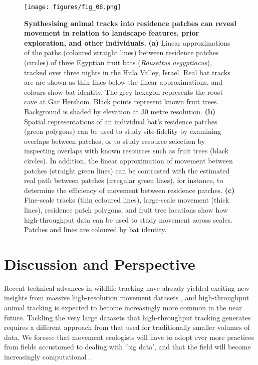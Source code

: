 \begin{refsection}[sorting=nyt]
    \begin{figure}[h!]
        \centering
        \texttt{[image: figures/fig\_08.png]}
        \caption{
            \textbf{Synthesising animal tracks into residence patches can reveal movement in relation to landscape features, prior exploration, and other individuals.}
            \textbf{(a)} Linear approximations of the paths (coloured straight lines) between residence patches (circles) of three Egyptian fruit bats (\textit{Rousettus aegyptiacus}), tracked over three nights in the Hula Valley, Israel.
            Real bat tracks are are shown as thin lines below the linear approximations, and colours show bat identity. The grey hexagon represents the roost-cave at Gar Hershom.
            Black points represent known fruit trees.
            Background is shaded by elevation at 30 metre resolution.
            \textbf{(b)} Spatial representations of an individual bat's residence patches (green polygons) can be used to study site-fidelity by examining overlaps between patches, or to study resource selection by inspecting overlaps with known resources such as fruit trees (black circles).
            In addition, the linear approximation of movement between patches (straight green lines) can be contrasted with the estimated real path between patches (irregular green lines), for instance, to determine the efficiency of movement between residence patches.
            \textbf{(c)} Fine-scale tracks (thin coloured lines), large-scale movement (thick lines), residence patch polygons, and fruit tree locations show how high-throughput data can be used to study movement across scales.
            Patches and lines are coloured by bat identity.
        }
        \label{fig:figure_bats}
    \end{figure}

    \section*{Discussion and Perspective}

    Recent technical advances in wildlife tracking have already yielded exciting new insights from massive high-resolution movement datasets \citep{aspillaga2021, aspillaga2021a, baktoft2017, baktoft2019, harel2016, harel2018, oudman2018, papageorgiou2019, tsoar2011, strandburg-peshkin2015, toledo2020, beardsworth2021a, beardsworth2021b, corl2020, vilk2021, lourie2021}, and high-throughput animal tracking is expected to become increasingly more common in the near future.
    Tackling the very large datasets that high-throughput tracking generates requires a different approach from that used for traditionally smaller volumes of data.
    We foresee that movement ecologists will have to adopt ever more practices from fields accustomed to dealing with `big data', and that the field will become increasingly computational \citep{peng2011}.


\end{refsection}
